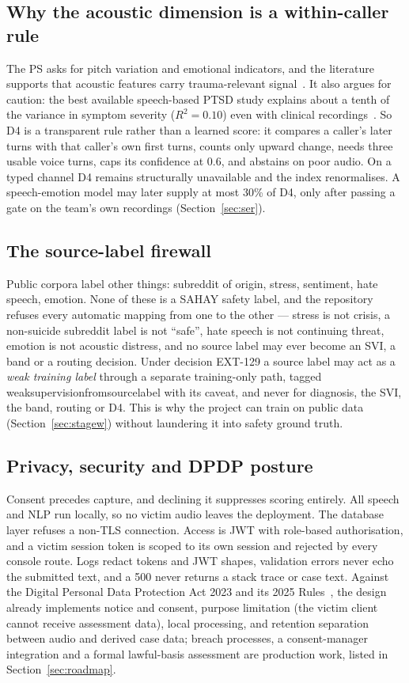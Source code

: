 \documentclass[11pt,a4paper]{article}
\newcommand{\codeus}{\textunderscore\allowbreak}
\DeclareRobustCommand{\code}[1]{{\ttfamily\let\_\codeus #1}}
\begin{document}
\subsection{Why the acoustic dimension is a within-caller rule}
\label{sec:d4}
The PS asks for pitch variation and emotional indicators, and the literature supports that acoustic
features carry trauma-relevant signal~\cite{hu2024,islam2024}. It also argues for caution: the best
available speech-based PTSD study explains about a tenth of the variance in symptom severity
($R^2 = 0.10$) even with clinical recordings~\cite{hu2024}. So D4 is a transparent rule rather than a
learned score: it compares a caller's later turns with that caller's own first turns, counts only
upward change, needs three usable voice turns, caps its confidence at 0.6, and abstains on poor audio.
On a typed channel D4 remains structurally unavailable and the index renormalises. A speech-emotion
model may later supply at most 30\% of D4, only after passing a gate on the team's own recordings
(Section~\ref{sec:ser}).

\subsection{The source-label firewall}
\label{sec:firewall}
Public corpora label other things: subreddit of origin, stress, sentiment, hate speech, emotion. None
of these is a SAHAY safety label, and the repository refuses every automatic mapping from one to the
other --- stress is not crisis, a non-suicide subreddit label is not ``safe'', hate speech is not
continuing threat, emotion is not acoustic distress, and no source label may ever become an SVI, a
band or a routing decision. Under decision EXT-129 a source label may act as a \emph{weak training
label} through a separate training-only path, tagged \code{weak\_supervision\_from\_source\_label}
with its caveat, and never for diagnosis, the SVI, the band, routing or D4. This is why the project
can train on public data (Section~\ref{sec:stagew}) without laundering it into safety ground truth.

\subsection{Privacy, security and DPDP posture}
\label{sec:privacy}
Consent precedes capture, and declining it suppresses scoring entirely. All speech and NLP run
locally, so no victim audio leaves the deployment. The database layer refuses a non-TLS connection.
Access is JWT with role-based authorisation, and a victim session token is scoped to its own session
and rejected by every console route. Logs redact tokens and JWT shapes, validation errors never echo
the submitted text, and a 500 never returns a stack trace or case text. Against the Digital Personal
Data Protection Act 2023 and its 2025 Rules~\cite{meity2023}, the design already implements notice
and consent, purpose limitation (the victim client cannot receive assessment data), local processing,
and retention separation between audio and derived case data; breach processes, a consent-manager
integration and a formal lawful-basis assessment are production work, listed in
Section~\ref{sec:roadmap}.
\end{document}
